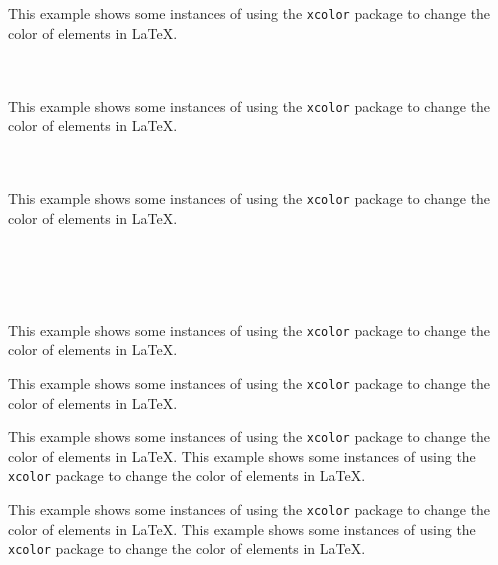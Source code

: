 \documentclass[12pt]{article}
\begin{document}
\begin{sidemark}[colorWarning]
    {\huge \color{colorWarning} \symbolWarning}\\\\
    This example shows some instances of using the \texttt{xcolor} package 
    to change the color of elements in \LaTeX.
\end{sidemark}


\begin{sidemark}[colorInfo][2cm][9pt]
    {\huge \color{colorInfo} \symbolInfo}\\\\
    This example shows some instances of using the \texttt{xcolor} package 
    to change the color of elements in \LaTeX.
\end{sidemark}

\begin{sidemark}[colorInfo2][2cm][9pt]
    {\huge \color{colorInfo2} \symbolInfo}\\\\
    This example shows some instances of using the \texttt{xcolor} package 
    to change the color of elements in \LaTeX.
\end{sidemark}


\begin{sidemark}[colorTodo][2cm][9pt]
    {\huge \color{colorTodo} \symbolInfo}\\\\
    {\huge \color{colorTodo} \faArrows*}\\\\
    This example shows some instances of using the \texttt{xcolor} package 
    to change the color of elements in \LaTeX.
\end{sidemark}


\begin{sidemark}[colorInfo][][9pt]
    This example shows some instances of using the \texttt{xcolor} package 
    to change the color of elements in \LaTeX.
\end{sidemark}



\begin{sidemark}[colorInfo][2cm][0pt]
        \begin{sidemark}[colorInfo][-0.5cm][0pt]
        This example shows some instances of using the \texttt{xcolor} package 
        to change the color of elements in \LaTeX.
        This example shows some instances of using the \texttt{xcolor} package 
        to change the color of elements in \LaTeX.
        \end{sidemark}
    This example shows some instances of using the \texttt{xcolor} package 
    to change the color of elements in \LaTeX.
    This example shows some instances of using the \texttt{xcolor} package 
    to change the color of elements in \LaTeX.
\end{sidemark}
\end{document}

